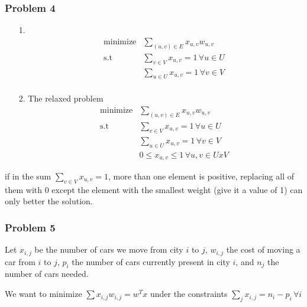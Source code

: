\documentclass[12pt]{article}
\newcommand{\Q}[1]{\subsubsection*{Problem #1}}
\begin{document}
\Q{4}
\begin{itemize}
\item [1.]
\begin{align*}
    &\text{minimize} & \sum_{(u, v) \in E} x_{u, v} w_{u, v} \\
    &\text{s.t}      & \sum_{v \in V} x_{u,v}  = 1 \, \forall u \in U \\
    &                & \sum_{u \in U} x_{u,v}  = 1 \, \forall v \in V \\
\end{align*}

\item [2.] The relaxed problem
\begin{align*}
    &\text{minimize} & \sum_{(u, v) \in E} x_{u, v} w_{u, v} \\
    &\text{s.t}      & \sum_{v \in V} x_{u,v}  = 1 \, \forall u \in U \\
    &                & \sum_{u \in U} x_{u,v}  = 1 \, \forall v \in V \\
    &                & 0 \leq x_{u,v} \leq 1 \, \forall u,v \in UxV 
\end{align*}
\end{itemize}

if in the sum $\sum_{v \in V} x_{u,v}  = 1$, more than one element is positive, replacing all of them with 0 except the element with the smallest weight (give it a value of 1) can only better the solution.

\Q{5}
Let $x_{i, j}$ be the number of cars we move from city $i$ to $j$, $w_{i,j}$ the cost of moving a car from $i$ to $j$, $p_i$ the number of cars currently present in city $i$, and $n_j$ the number of cars needed.

We want to minimize $\sum x_{i,j} w_{i,j} = w^T x$ under the constraints
$ \sum_j x_{i,j} = n_i - p_i \, \forall i$
\end{document}
